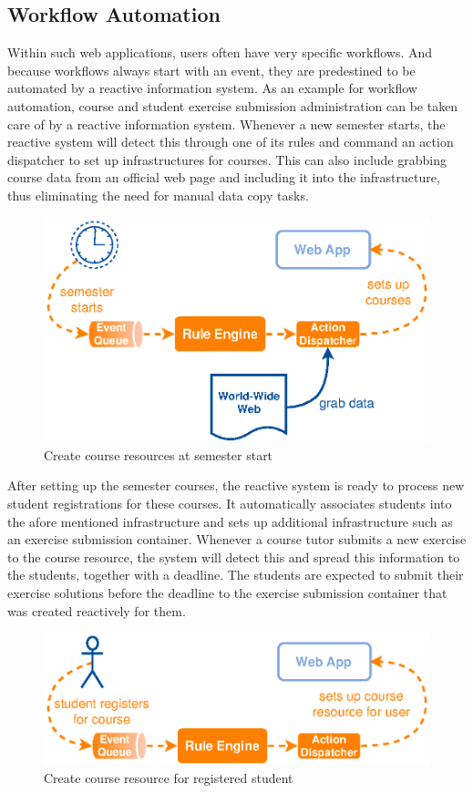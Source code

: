 \subsection{Workflow Automation}
Within such web applications, users often have very specific workflows.
And because workflows always start with an event, they are predestined to be automated by a reactive information system.
As an example for workflow automation, course and student exercise submission administration can be taken care of by a reactive information system.
Whenever a new semester starts, the reactive system will detect this through one of its rules and command an action dispatcher to set up infrastructures for courses.
This can also include grabbing course data from an official web page and including it into the infrastructure, thus eliminating the need for manual data copy tasks.
\begin{figure}[!ht]
  \centering
  \includegraphics{figures/ProBinderCourseSetup}
  \caption{Create course resources at semester start}
  \label{fig:ProBinderCourseSetup}
\end{figure}

After setting up the semester courses, the reactive system is ready to process new student registrations for these courses.
It automatically associates students into the afore mentioned infrastructure and sets up additional infrastructure such as an exercise submission container.
Whenever a course tutor submits a new exercise to the course resource, the system will detect this and spread this information to the students, together with a deadline.
The students are expected to submit their exercise solutions before the deadline to the exercise submission container that was created reactively for them.
\begin{figure}[!ht]
  \centering
  \includegraphics{figures/ProBinderStudentRegisters}
  \caption{Create course resource for registered student}
  \label{fig:ProBinderStudentRegisters}
\end{figure}

